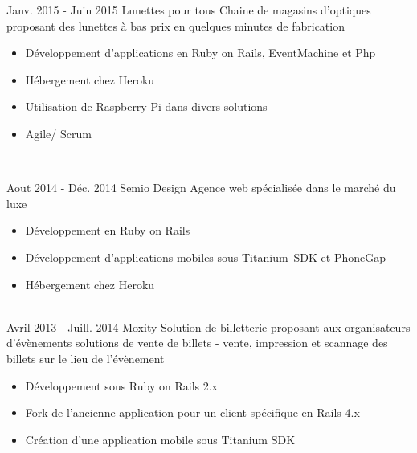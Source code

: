 \documentclass[letterpaper]{twentysecondcv} %
\begin{document}
\begin{twenty}

    \twentyitem
   		{Janv. 2015 - }
		{Juin 2015}
        {Lunettes pour tous}
        {}
        {Chaine de magasins d'optiques proposant des lunettes à bas prix en quelques minutes de fabrication}
        {
        {\begin{itemize}
        \item Développement d'applications en Ruby on Rails, \mbox{EventMachine} et Php
        \item Hébergement chez Heroku
        \item Utilisation de Raspberry Pi dans divers solutions
        \item Agile/ Scrum


    \end{itemize}}
        }
     \\

\end{twenty}

\begin{twenty}

     \twentyitem
   		{Aout 2014 - }
		{Déc. 2014}
        {Semio Design}
        {}
        {Agence web spécialisée dans le marché du luxe}
        {
        \begin{itemize}
        \item Développement en Ruby on Rails
        \item Développement d'applications mobiles sous \mbox{Titanium SDK} et PhoneGap
        \item Hébergement chez Heroku
    \end{itemize}
    	}

\end{twenty}

\begin{twenty}

     \\   
    \twentyitem
   		{Avril 2013 - }
		{Juill. 2014}
        {Moxity}
        {}
        {Solution de billetterie proposant aux organisateurs d'évènements solutions de vente de billets - vente, impression et scannage des billets sur le lieu de l'évènement}
        {
        {\begin{itemize}
        \item Développement sous Ruby on Rails 2.x
        \item Fork de l'ancienne application pour un client spécifique en Rails 4.x
        \item Création d'une application mobile sous Titanium SDK


    \end{itemize}}
        }

\end{twenty}
\end{document}
